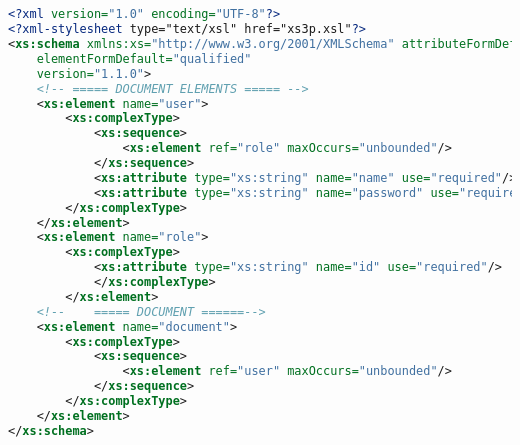 \begin{lstlisting}[language=XML]


<?xml version="1.0" encoding="UTF-8"?>
<?xml-stylesheet type="text/xsl" href="xs3p.xsl"?>
<xs:schema xmlns:xs="http://www.w3.org/2001/XMLSchema" attributeFormDefault="unqualified"
	elementFormDefault="qualified"
	version="1.1.0">
	<!-- ===== DOCUMENT ELEMENTS ===== -->
	<xs:element name="user">
		<xs:complexType>
			<xs:sequence>
				<xs:element ref="role" maxOccurs="unbounded"/>
			</xs:sequence>
			<xs:attribute type="xs:string" name="name" use="required"/>
			<xs:attribute type="xs:string" name="password" use="required"/>
		</xs:complexType>
	</xs:element>
	<xs:element name="role">
		<xs:complexType>
			<xs:attribute type="xs:string" name="id" use="required"/>
			</xs:complexType>
		</xs:element>
	<!--    ===== DOCUMENT ======-->
	<xs:element name="document">
		<xs:complexType>
			<xs:sequence>
				<xs:element ref="user" maxOccurs="unbounded"/>
			</xs:sequence>
		</xs:complexType>
	</xs:element>
</xs:schema>
\end{lstlisting}


